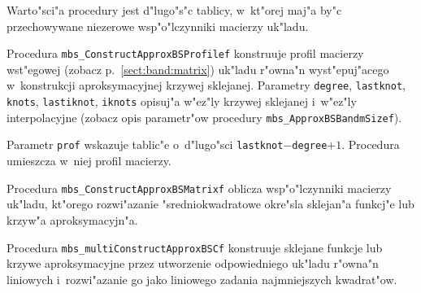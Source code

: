 Warto"sci"a procedury jest d"lugo"s"c tablicy, w~kt"orej maj"a by"c
przechowywane niezerowe wsp"o"lczynniki macierzy uk"ladu.

\vspace{\bigskipamount}
Procedura \texttt{mbs\_ConstructApproxBSProfilef} konstruuje profil macierzy
wst"egowej (zobacz p.~\ref{sect:band:matrix}) uk"ladu r"owna"n
wyst"epuj"acego w~konstrukcji aproksymacyjnej krzywej sklejanej. Parametry
\texttt{degree}, \texttt{lastknot}, \texttt{knots}, \texttt{lastiknot},
\texttt{iknots} opisuj"a w"ez"ly krzywej sklejanej i~w"ez"ly interpolacyjne
(zobacz opis parametr"ow procedury \texttt{mbs\_ApproxBSBandmSizef}).

Parametr \texttt{prof} wskazuje tablic"e o~d"lugo"sci
\texttt{lastknot}$-$\texttt{degree}$+1$. Procedura umieszcza w~niej profil
macierzy.

\vspace{\bigskipamount}
\begin{sloppypar}
Procedura \texttt{mbs\_ConstructApproxBSMatrixf} oblicza wsp"o"lczynniki
macierzy uk"ladu, kt"orego rozwi"azanie "sredniokwadratowe okre"sla
sklejan"a funkcj"e lub krzyw"a aproksymacyjn"a.
\end{sloppypar}

\vspace{\bigskipamount}
\begin{sloppypar}
Procedura \texttt{mbs\_multiConstructApproxBSCf} konstruuje sklejane
funkcje lub krzy\-we aproksymacyjne przez utworzenie odpowiedniego uk"ladu
r"owna"n liniowych i~rozwi"azanie go jako liniowego zadania najmniejszych
kwadrat"ow.
\end{sloppypar}

